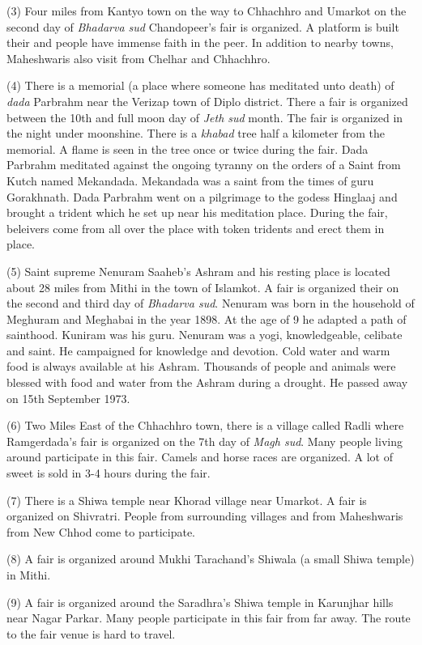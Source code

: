 (3) Four miles from Kantyo town on the way to Chhachhro and Umarkot on the
second day of \textit{Bhadarva sud} Chandopeer's fair is organized. A platform
is built their and people have immense faith in the peer. In addition to nearby
towns, Maheshwaris also visit from Chelhar and Chhachhro.

(4) There is a memorial (a place where someone has meditated unto death) of
\textit{dada} Parbrahm near the Verizap town of Diplo district. There a fair is
organized between the 10th and full moon day of \textit{Jeth sud} month. The
fair is organized in the night under moonshine. There is a \textit{khabad} tree
half a kilometer from the memorial. A flame is seen in the tree once or twice
during the fair. Dada Parbrahm meditated against the ongoing tyranny on the
orders of a Saint from Kutch named Mekandada. Mekandada was a saint from the
times of guru Gorakhnath. Dada Parbrahm went on a pilgrimage to the godess
Hinglaaj and brought a trident which he set up near his meditation place.
During the fair, beleivers come from all over the place with token tridents and
erect them in place.

(5) Saint supreme Nenuram Saaheb's Ashram and his resting place is located
about 28 miles from Mithi in the town of Islamkot. A fair is organized their on
the second and third day of \textit{Bhadarva sud}. Nenuram was born in the
household of Meghuram and Meghabai in the year 1898. At the age of 9 he adapted
a path of sainthood. Kuniram was his guru. Nenuram was a yogi, knowledgeable,
celibate and saint. He campaigned for knowledge and devotion. Cold water and
warm food is always available at his Ashram. Thousands of people and animals
were blessed with food and water from the Ashram during a drought. He passed
away on 15th September 1973.

(6) Two Miles East of the Chhachhro town, there is a village called Radli where
Ramgerdada's fair is organized on the 7th day of \textit{Magh sud}. Many people
living around participate in this fair. Camels and horse races are organized. A
lot of sweet is sold in 3-4 hours during the fair.

(7) There is a Shiwa temple near Khorad village near Umarkot. A fair is
organized on Shivratri. People from surrounding villages and from Maheshwaris
from New Chhod come to participate.

(8) A fair is organized around Mukhi Tarachand's Shiwala (a small Shiwa temple)
in Mithi.

(9) A fair is organized around the Saradhra's Shiwa temple in Karunjhar hills
near Nagar Parkar. Many people participate in this fair from far away. The
route to the fair venue is hard to travel. 

